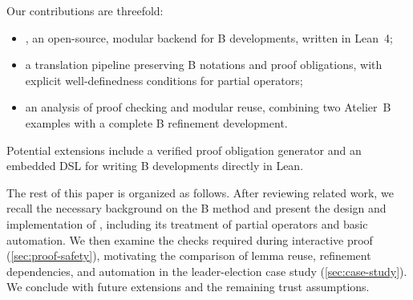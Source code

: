 Our contributions are threefold:
\begin{itemize}
	\item \barrel, an open-source, modular backend for B developments, written in Lean~4;
	\item a translation pipeline preserving B notations and proof obligations, with explicit well-definedness conditions for partial operators;
	\item an analysis of proof checking and modular reuse, combining two Atelier~B examples with a complete B refinement development.
\end{itemize}
Potential extensions include a verified proof obligation generator and an embedded DSL for writing B developments directly in Lean.

The rest of this paper is organized as follows.
After reviewing related work, we recall the necessary background on the B method and present the design and implementation of \barrel, including its treatment of partial operators and basic automation.
We then examine the checks required during interactive proof (\cref{sec:proof-safety}), motivating the comparison of lemma reuse, refinement dependencies, and automation in the leader-election case study (\cref{sec:case-study}).
We conclude with future extensions and the remaining trust assumptions.
